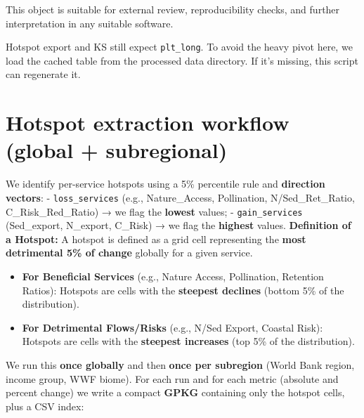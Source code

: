 \documentclass[
  letterpaper,
  DIV=11,
  numbers=noendperiod]{scrartcl}
\providecommand{\tightlist}{%
  \setlength{\itemsep}{0pt}\setlength{\parskip}{0pt}}
\begin{document}
\begin{tcolorbox}
This object is suitable for external review, reproducibility checks, and
further interpretation in any suitable software.

\end{tcolorbox}

Hotspot export and KS still expect \texttt{plt\_long}. To avoid the
heavy pivot here, we load the cached table from the processed data
directory. If it's missing, this script can regenerate it.

\section{Hotspot extraction workflow (global +
subregional)}\label{hotspot-extraction-workflow-global-subregional}

We identify per-service hotspots using a 5\% percentile rule and
\textbf{direction vectors}: - \texttt{loss\_services} (e.g.,
Nature\_Access, Pollination, N/Sed\_Ret\_Ratio, C\_Risk\_Red\_Ratio) →
we flag the \textbf{lowest} values; - \texttt{gain\_services}
(Sed\_export, N\_export, C\_Risk) → we flag the \textbf{highest} values.
\textbf{Definition of a Hotspot:} A hotspot is defined as a grid cell
representing the \textbf{most detrimental 5\% of change} globally for a
given service.

\begin{itemize}
\tightlist
\item
  \textbf{For Beneficial Services} (e.g., Nature Access, Pollination,
  Retention Ratios): Hotspots are cells with the \textbf{steepest
  declines} (bottom 5\% of the distribution).
\item
  \textbf{For Detrimental Flows/Risks} (e.g., N/Sed Export, Coastal
  Risk): Hotspots are cells with the \textbf{steepest increases} (top
  5\% of the distribution).
\end{itemize}

We run this \textbf{once globally} and then \textbf{once per subregion}
(World Bank region, income group, WWF biome). For each run and for each
metric (absolute and percent change) we write a compact \textbf{GPKG}
containing only the hotspot cells, plus a CSV index:
\end{document}
